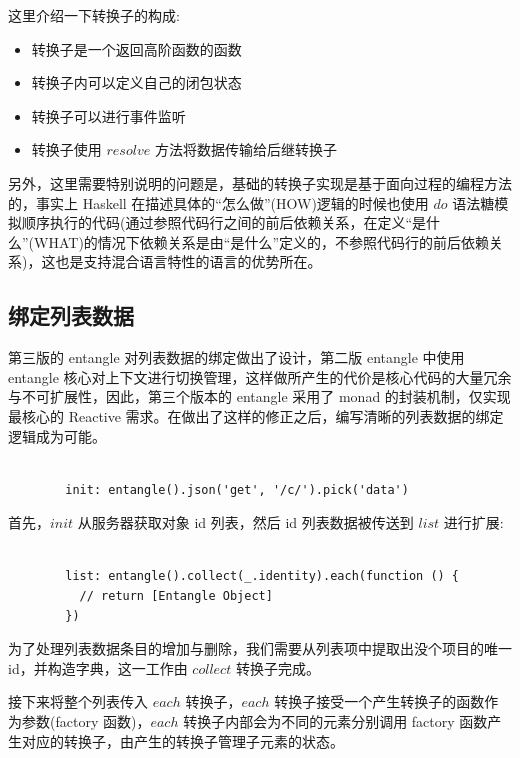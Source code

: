 这里介绍一下转换子的构成:

\begin{itemize}
  \item 转换子是一个返回高阶函数的函数
  \item 转换子内可以定义自己的闭包状态
  \item 转换子可以进行事件监听
  \item 转换子使用 $resolve$ 方法将数据传输给后继转换子
\end{itemize}

另外，这里需要特别说明的问题是，基础的转换子实现是基于面向过程的编程方法的，事实上 Haskell 在描述具体的“怎么做”(HOW)逻辑的时候也使用 $do$ 语法糖模拟顺序执行的代码(通过参照代码行之间的前后依赖关系，在定义“是什么”(WHAT)的情况下依赖关系是由“是什么”定义的，不参照代码行的前后依赖关系)，这也是支持混合语言特性的语言的优势所在。

\subsection{绑定列表数据}

第三版的 entangle 对列表数据的绑定做出了设计，第二版 entangle 中使用 entangle 核心对上下文进行切换管理，这样做所产生的代价是核心代码的大量冗余与不可扩展性，因此，第三个版本的 entangle 采用了 monad 的封装机制，仅实现最核心的 Reactive 需求。在做出了这样的修正之后，编写清晰的列表数据的绑定逻辑成为可能。

\begin{verbatim}

        init: entangle().json('get', '/c/').pick('data')

\end{verbatim}

首先，$init$ 从服务器获取对象 id 列表，然后 id 列表数据被传送到 $list$ 进行扩展:

\begin{verbatim}

        list: entangle().collect(_.identity).each(function () {
          // return [Entangle Object]
        })

\end{verbatim}

为了处理列表数据条目的增加与删除，我们需要从列表项中提取出没个项目的唯一 id，并构造字典，这一工作由 $collect$ 转换子完成。

接下来将整个列表传入 $each$ 转换子，$each$ 转换子接受一个产生转换子的函数作为参数(factory 函数)，$each$ 转换子内部会为不同的元素分别调用 factory 函数产生对应的转换子，由产生的转换子管理子元素的状态。

